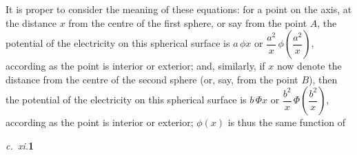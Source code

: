 \documentclass[12pt,a4paper,oneside]{book}
\begin{document}
It is proper to consider the meaning of these equations: for a point on the axis, at the distance $x$ from the centre of the first sphere, or say from the point $A$, the potential of the electricity on this spherical surface is $a\,\phi x$ or $\dfrac{a^2}{x}\,\phi\!\left(\dfrac{a^2}{x}\right)$, according as the point is interior or exterior; and, similarly, if $x$ now denote the distance from the centre of the second sphere (or, say, from the point $B$), then the potential of the electricity on this spherical surface is $b\,\Phi x$ or $\dfrac{b^2}{x}\,\Phi\!\left(\dfrac{b^2}{x}\right)$, according as the point is interior or exterior; $\phi(x)$ is thus the same function of

\vfill

\noindent\textit{c.~xi.}\hfill\textbf{1}
\end{document}
